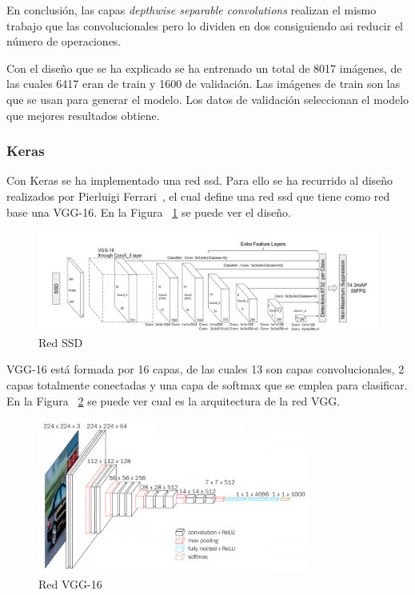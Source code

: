 En conclusión, las capas \textit{depthwise separable convolutions} realizan el mismo trabajo que las convolucionales pero lo dividen en dos consiguiendo asi reducir el número de operaciones.

Con el diseño que se ha explicado se ha entrenado un total de 8017 imágenes, de las cuales 6417 eran de train y 1600 de validación. Las imágenes de train son las que se usan para generar el modelo. Los datos de validación seleccionan el modelo que mejores resultados obtiene.

 \subsubsection{Keras}
 
 Con Keras se ha implementado una red \acrshort{ssd}. Para ello se ha recurrido al diseño realizados por Pierluigi Ferrari~\cite{ssd_ferrari}, el cual define una red \acrshort{ssd} que tiene como red base una VGG-16. En la Figura ~\ref{fig.ssd_300} se puede ver el diseño.
 
 \begin{figure}
\begin{center}
	\includegraphics[width=1.1\textwidth]{figures/Diseno_global/ssd300.png}
   \caption{Red SSD}
	\label{fig.ssd_300}
\end{center}
\end{figure}

VGG-16  está formada por 16 capas, de las cuales 13 son capas convolucionales, 2 capas totalmente conectadas y una capa de softmax que se emplea para clasificar. En la Figura ~\ref{fig.vgg16} se puede ver cual es la arquitectura de la red VGG.

 \begin{figure}
\begin{center}
	\includegraphics[width=0.8\textwidth]{figures/Diseno_global/vgg16.png}
   \caption{Red VGG-16}
	\label{fig.vgg16}
\end{center}
\end{figure}

